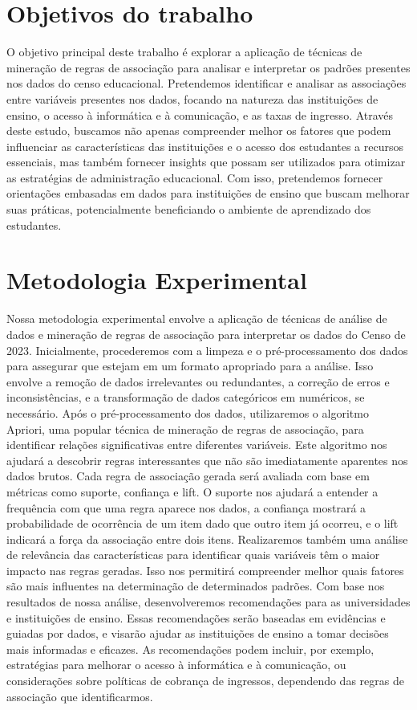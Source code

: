 \documentclass[conference]{IEEEtran}
\begin{document}
\section{Objetivos do trabalho}
O objetivo principal deste trabalho é explorar a aplicação de técnicas de mineração de regras de associação para analisar e interpretar os padrões presentes nos dados do censo educacional. Pretendemos identificar e analisar as associações entre variáveis presentes nos dados, focando na natureza das instituições de ensino, o acesso à informática e à comunicação, e as taxas de ingresso.
Através deste estudo, buscamos não apenas compreender melhor os fatores que podem influenciar as características das instituições e o acesso dos estudantes a recursos essenciais, mas também fornecer insights que possam ser utilizados para otimizar as estratégias de administração educacional. Com isso, pretendemos fornecer orientações embasadas em dados para instituições de ensino que buscam melhorar suas práticas, potencialmente beneficiando o ambiente de aprendizado dos estudantes.

\section{Metodologia Experimental}
Nossa metodologia experimental envolve a aplicação de técnicas de análise de dados e mineração de regras de associação para interpretar os dados do Censo de 2023. Inicialmente, procederemos com a limpeza e o pré-processamento dos dados para assegurar que estejam em um formato apropriado para a análise. Isso envolve a remoção de dados irrelevantes ou redundantes, a correção de erros e inconsistências, e a transformação de dados categóricos em numéricos, se necessário.
Após o pré-processamento dos dados, utilizaremos o algoritmo Apriori, uma popular técnica de mineração de regras de associação, para identificar relações significativas entre diferentes variáveis. Este algoritmo nos ajudará a descobrir regras interessantes que não são imediatamente aparentes nos dados brutos.
Cada regra de associação gerada será avaliada com base em métricas como suporte, confiança e lift. O suporte nos ajudará a entender a frequência com que uma regra aparece nos dados, a confiança mostrará a probabilidade de ocorrência de um item dado que outro item já ocorreu, e o lift indicará a força da associação entre dois itens.
Realizaremos também uma análise de relevância das características para identificar quais variáveis têm o maior impacto nas regras geradas. Isso nos permitirá compreender melhor quais fatores são mais influentes na determinação de determinados padrões.
Com base nos resultados de nossa análise, desenvolveremos recomendações para as universidades e instituições de ensino. Essas recomendações serão baseadas em evidências e guiadas por dados, e visarão ajudar as instituições de ensino a tomar decisões mais informadas e eficazes. As recomendações podem incluir, por exemplo, estratégias para melhorar o acesso à informática e à comunicação, ou considerações sobre políticas de cobrança de ingressos, dependendo das regras de associação que identificarmos.
\end{document}
